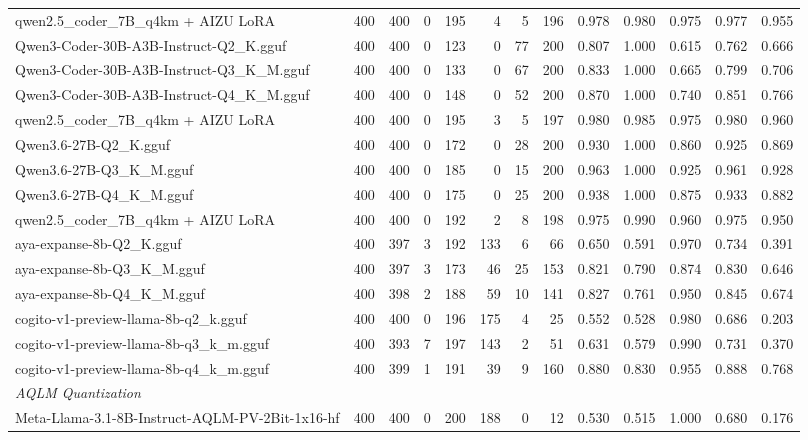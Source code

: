 \begin{table}[htbp]
{\begin{tabular}{lrrrrrrrrrrrr}
    qwen2.5\_coder\_7B\_q4km + AIZU LoRA & 400 & 400 & 0 & 195 & 4 & 5 & 196 & 0.978 & 0.980 & 0.975 & 0.977 & \cellcolor{green!30}0.955 \\
    Qwen3-Coder-30B-A3B-Instruct-Q2\_K.gguf & 400 & 400 & 0 & 123 & 0 & 77 & 200 & 0.807 & 1.000 & 0.615 & 0.762 & 0.666 \\
    Qwen3-Coder-30B-A3B-Instruct-Q3\_K\_M.gguf & 400 & 400 & 0 & 133 & 0 & 67 & 200 & 0.833 & 1.000 & 0.665 & 0.799 & 0.706 \\
    Qwen3-Coder-30B-A3B-Instruct-Q4\_K\_M.gguf & 400 & 400 & 0 & 148 & 0 & 52 & 200 & 0.870 & 1.000 & 0.740 & 0.851 & 0.766 \\
    qwen2.5\_coder\_7B\_q4km + AIZU LoRA & 400 & 400 & 0 & 195 & 3 & 5 & 197 & 0.980 & 0.985 & 0.975 & 0.980 & \cellcolor{green!50}0.960 \\
    Qwen3.6-27B-Q2\_K.gguf & 400 & 400 & 0 & 172 & 0 & 28 & 200 & 0.930 & 1.000 & 0.860 & 0.925 & 0.869 \\
    Qwen3.6-27B-Q3\_K\_M.gguf & 400 & 400 & 0 & 185 & 0 & 15 & 200 & 0.963 & 1.000 & 0.925 & 0.961 & \cellcolor{green!10}0.928 \\
    Qwen3.6-27B-Q4\_K\_M.gguf & 400 & 400 & 0 & 175 & 0 & 25 & 200 & 0.938 & 1.000 & 0.875 & 0.933 & 0.882 \\
    qwen2.5\_coder\_7B\_q4km + AIZU LoRA & 400 & 400 & 0 & 192 & 2 & 8 & 198 & 0.975 & 0.990 & 0.960 & 0.975 & \cellcolor{green!20}0.950 \\
    aya-expanse-8b-Q2\_K.gguf & 400 & 397 & 3 & 192 & 133 & 6 & 66 & 0.650 & 0.591 & 0.970 & 0.734 & 0.391 \\
    aya-expanse-8b-Q3\_K\_M.gguf & 400 & 397 & 3 & 173 & 46 & 25 & 153 & 0.821 & 0.790 & 0.874 & 0.830 & 0.646 \\
    aya-expanse-8b-Q4\_K\_M.gguf & 400 & 398 & 2 & 188 & 59 & 10 & 141 & 0.827 & 0.761 & 0.950 & 0.845 & 0.674 \\
    cogito-v1-preview-llama-8b-q2\_k.gguf & 400 & 400 & 0 & 196 & 175 & 4 & 25 & 0.552 & 0.528 & 0.980 & 0.686 & 0.203 \\
    cogito-v1-preview-llama-8b-q3\_k\_m.gguf & 400 & 393 & 7 & 197 & 143 & 2 & 51 & 0.631 & 0.579 & 0.990 & 0.731 & 0.370 \\
    cogito-v1-preview-llama-8b-q4\_k\_m.gguf & 400 & 399 & 1 & 191 & 39 & 9 & 160 & 0.880 & 0.830 & 0.955 & 0.888 & 0.768 \\
    \midrule
    \multicolumn{13}{l}{\textit{AQLM Quantization}} \\
    \midrule
    Meta-Llama-3.1-8B-Instruct-AQLM-PV-2Bit-1x16-hf & 400 & 400 & 0 & 200 & 188 & 0 & 12 & 0.530 & 0.515 & 1.000 & 0.680 & 0.176 \\

\end{tabular}}
\end{table}
